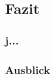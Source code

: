 \section{Fazit}
\label{sec:fazit}

\subsection{j...}


\subsection{Ausblick}
\label{subsec:ausblick}
